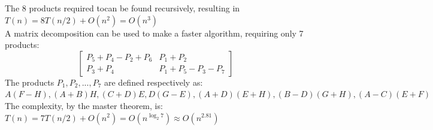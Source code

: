 \documentclass{article}
\begin{document}
			The 8 products required tocan be found recursively, resulting in $T(n) = 8T(n/2) + O(n^2) = O(n^3)$ \\
			A matrix decomposition can be used to make a faster algorithm, requiring only 7 products:
			\begin{equation*}
				\begin{bmatrix}
					P_5 + P_4 - P_2 + P_6 & P_1 + P_2 \\
					P_3 + P_4 & P_1 + P_5 - P_3 - P_7
					\end{bmatrix}
				\end{equation*}
			The products $P_1, P_2, ..., P_7$ are defined respectively as: \\
			$A(F - H), (A + B)H, (C + D)E, D(G - E), (A + D)(E + H), (B - D)(G + H), (A - C)(E + F)$ \\
			The complexity, by the master theorem, is: $T(n) = 7T(n/2) + O(n^2) = O(n^{\log_2 7}) \approx O(n^{2.81})$
\end{document}
